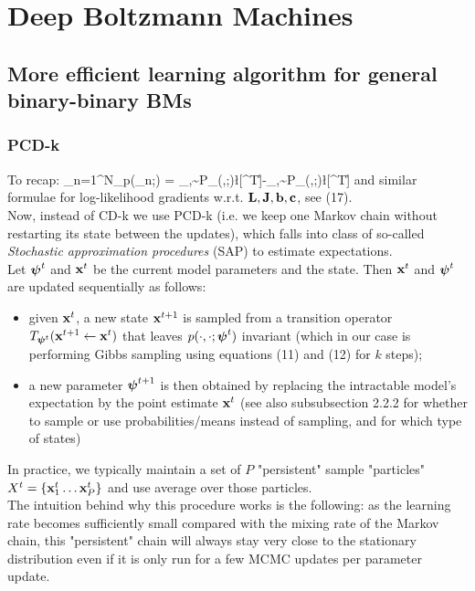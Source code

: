 \newpage
\section{Deep Boltzmann Machines \cite{salakhutdinov2013learning, salakhutdinov2009deep, goodfellow2016deep}}
\subsection{More efficient learning algorithm for general binary-binary BMs}
\subsubsection{PCD-k}
To recap:
\bg
{}\sum_{n=1}^N\nabla_{}\log p(_n;\bs{\psi}) = \E_{,\sim P_{}(,;\bs{\psi})}\l[^T\r]-\E_{,\sim P_{}(,;\bs{\psi})}\l[^T\r]
\eg
and similar formulae for log-likelihood gradients w.r.t. $\mathbf{L},\mathbf{J},\mathbf{b},\mathbf{c}$, see (17).
\\[0.5em]
Now, instead of CD-k we use PCD-k (i.e. we keep one Markov chain without restarting its state between the updates), which falls into class of so-called \emph{Stochastic approximation procedures} (SAP) to estimate  expectations.
\\[1em]
Let $\boldsymbol{\psi}^t$ and $\mathbf{x}^t$ be the current model parameters and the state. Then $\mathbf{x}^t$ and $\boldsymbol{\psi}^t$ are updated sequentially as follows:
\begin{itemize}
	\item given $\mathbf{x}^t$, a new state $\mathbf{x}^{t+1}$ is sampled from a transition operator $T_{\boldsymbol{\psi}^t}(\mathbf{x}^{t+1}\leftarrow \mathbf{x}^t)$ that leaves $p(\cdot,\cdot;\boldsymbol{\psi}^t)$ invariant (which in our case is performing Gibbs sampling using equations (11) and (12) for $k$ steps);
	\item a new parameter $\boldsymbol{\psi}^{t+1}$ is then obtained by replacing the intractable model's expectation by the point estimate $\mathbf{x}^t$ (see also subsubsection 2.2.2 for whether to sample or use probabilities/means instead of sampling, and for which type of states)
\end{itemize}
In practice, we typically maintain a set of $P$ "persistent" sample "particles" $X^t=\{\mathbf{x}_1^t\ldots \mathbf{x}_{P}^t\}$ and use average over those particles.
\\[1em]
The intuition behind why this procedure works is the following: as the learning rate becomes sufficiently small compared with the mixing rate of the Markov chain, this "persistent" chain will always stay very close to the stationary distribution even if it is only run for a few MCMC updates per parameter update.
